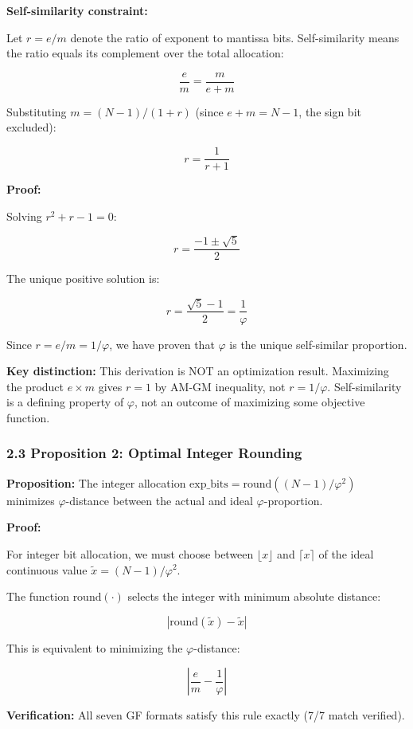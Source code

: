 \textbf{Self-similarity constraint:}

Let \(r = e/m\) denote the ratio of exponent to mantissa bits.
Self-similarity means the ratio equals its complement over the total
allocation:

\[\frac{e}{m} = \frac{m}{e + m}\]

Substituting \(m = (N-1)/(1+r)\) (since \(e + m = N-1\), the sign bit
excluded):

\[r = \frac{1}{r + 1}\]

\textbf{Proof:}

Solving \(r^2 + r - 1 = 0\):

\[r = \frac{-1 \pm \sqrt{5}}{2}\]

The unique positive solution is:

\[r = \frac{\sqrt{5} - 1}{2} = \frac{1}{\varphi}\]

Since \(r = e/m = 1/\varphi\), we have proven that \(\varphi\) is the
unique self-similar proportion.

\textbf{Key distinction:} This derivation is NOT an optimization result.
Maximizing the product \(e \times m\) gives \(r = 1\) by AM-GM
inequality, not \(r = 1/\varphi\). Self-similarity is a defining
property of \(\varphi\), not an outcome of maximizing some objective
function.

\subsubsection{2.3 Proposition 2: Optimal Integer
Rounding}\label{proposition-2-optimal-integer-rounding}

\textbf{Proposition:} The integer allocation
\(\text{exp\_bits} = \text{round}((N-1)/\varphi^2)\) minimizes
\(\varphi\)-distance between the actual and ideal
\(\varphi\)-proportion.

\textbf{Proof:}

For integer bit allocation, we must choose between \(\lfloor x \rfloor\)
and \(\lceil x \rceil\) of the ideal continuous value
\(\tilde{x} = (N-1)/\varphi^2\).

The function \(\text{round}(\cdot)\) selects the integer with minimum
absolute distance:

\[|\text{round}(\tilde{x}) - \tilde{x}|\]

This is equivalent to minimizing the \(\varphi\)-distance:

\[\left|\frac{e}{m} - \frac{1}{\varphi}\right|\]

\textbf{Verification:} All seven GF formats satisfy this rule exactly
(7/7 match verified).

